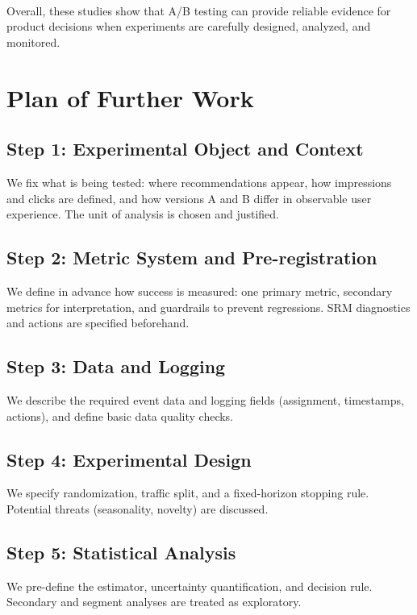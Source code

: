 \documentclass[a4paper,12pt]{extarticle}
\numberwithin{equation}{section}
\begin{document}
\paragraph{}Overall, these studies show that A/B testing can provide reliable evidence for
product decisions when experiments are carefully designed, analyzed, and monitored.

\clearpage

\section{Plan of Further Work}

\subsection{Step 1: Experimental Object and Context}
We fix what is being tested: where recommendations appear, how impressions and
clicks are defined, and how versions A and B differ in observable user experience.
The unit of analysis is chosen and justified.

\subsection{Step 2: Metric System and Pre-registration}
We define in advance how success is measured: one primary metric, secondary metrics
for interpretation, and guardrails to prevent regressions. SRM diagnostics and actions
are specified beforehand.

\subsection{Step 3: Data and Logging}
We describe the required event data and logging fields (assignment, timestamps, actions),
and define basic data quality checks.

\subsection{Step 4: Experimental Design}
We specify randomization, traffic split, and a fixed-horizon stopping rule.
Potential threats (seasonality, novelty) are discussed.

\subsection{Step 5: Statistical Analysis}
We pre-define the estimator, uncertainty quantification, and decision rule.
Secondary and segment analyses are treated as exploratory.
\end{document}
